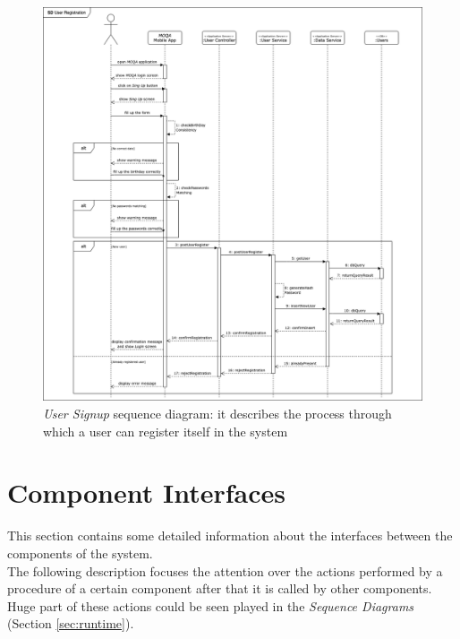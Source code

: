 \begin{figure}[H]
\begin{center}
  \includegraphics[width=\textwidth,keepaspectratio]{img/archi/sequences/signup.png}
  \hspace{0.05\linewidth}
  \centering
  \caption{\textit{User Signup} sequence diagram: it describes the process through which a user can register itself in the system}
  \label{img:archi_er}
\end{center}
\end{figure}






\section{Component Interfaces}
This section contains some detailed information about the interfaces between the components of the system.\\
The following description focuses the attention over the actions performed by a procedure of a certain component after that it is called by other components.\\
Huge part of these actions could be seen played in the \textit{Sequence Diagrams} (Section \ref{sec:runtime}).

